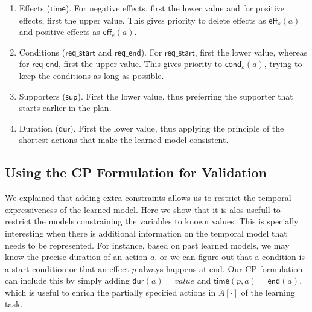 \documentclass[runningheads]{llncs}
\newcommand{\eff}{\mathsf{eff}}    %
\newcommand{\cond}{\mathsf{cond}}  %
\newcommand{\dur}{\mathsf{dur}}    %
\newcommand{\en}{\mathsf{end}}     %
\newcommand{\supp}{\mathsf{sup}}   %
\newcommand{\tim}{\mathsf{time}}   %
\newcommand{\reqs}{\mathsf{req\_{start}}} %
\newcommand{\reqe}{\mathsf{req\_{end}}}   %
\begin{document}

\begin{enumerate}
  \item Effects ($\tim$). For negative effects, first the lower value and for positive effects, first the upper value. This gives priority to delete effects as $\eff_s(a)$ and positive effects as $\eff_e(a)$.
  \item Conditions ($\reqs$ and $\reqe$). For $\reqs$, first the lower value, whereas for $\reqe$, first the upper value. This gives priority to $\cond_o(a)$, trying to keep the conditions as long as possible.
  \item Supporters ($\supp$). First the lower value, thus preferring the supporter that starts earlier in the plan.
  \item Duration ($\dur$). First the lower value, thus applying the principle of the shortest actions that make the learned model consistent.
\end{enumerate}


\subsection{Using the CP Formulation for Validation}
\label{sec:usingCPValidation}

We explained that adding extra constraints allows us to restrict the temporal expressiveness of the learned model. Here we show that it is alos usefull to restrict the models constraining the variables to known values. This is specially interesting when there is additional information on the temporal model that needs to be represented. For instance, based on past learned models, we may know the precise duration of an action $a$, or we can figure out that a condition is a start condition or that an effect $p$ always happens at end. Our CP formulation can include this by simply adding $\dur(a)=value$ and $\tim(p,a)=\en(a)$, which is useful to enrich the partially specified actions in $A[\cdot]$ of the learning task.
\end{document}
